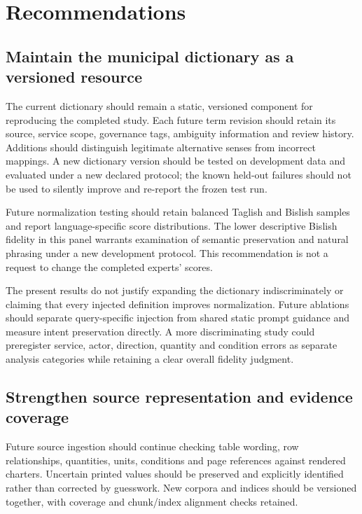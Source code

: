 \section{Recommendations}

\subsection{Maintain the municipal dictionary as a versioned resource}

The current dictionary should remain a static, versioned component for reproducing the completed study. Each future term revision should retain its source, service scope, governance tags, ambiguity information and review history. Additions should distinguish legitimate alternative senses from incorrect mappings. A new dictionary version should be tested on development data and evaluated under a new declared protocol; the known held-out failures should not be used to silently improve and re-report the frozen test run.


Future normalization testing should retain balanced Taglish and Bislish samples and report language-specific score distributions. The lower descriptive Bislish fidelity in this panel warrants examination of semantic preservation and natural phrasing under a new development protocol. This recommendation is not a request to change the completed experts' scores.


The present results do not justify expanding the dictionary indiscriminately or claiming that every injected definition improves normalization. Future ablations should separate query-specific injection from shared static prompt guidance and measure intent preservation directly. A more discriminating study could preregister service, actor, direction, quantity and condition errors as separate analysis categories while retaining a clear overall fidelity judgment.


\subsection{Strengthen source representation and evidence coverage}

Future source ingestion should continue checking table wording, row relationships, quantities, units, conditions and page references against rendered charters. Uncertain printed values should be preserved and explicitly identified rather than corrected by guesswork. New corpora and indices should be versioned together, with coverage and chunk/index alignment checks retained.


